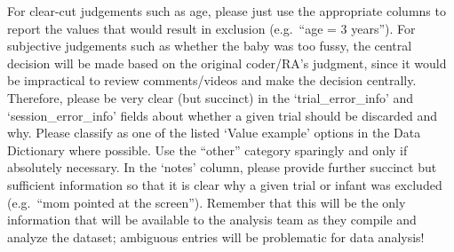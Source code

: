 \documentclass[
]{book}
\begin{document}
For clear-cut judgements such as age, please just use the appropriate columns to report the values that would result in exclusion (e.g.~``age = 3 years'').
For subjective judgements such as whether the baby was too fussy, the central decision will be made based on the original coder/RA's judgment, since it would be impractical to review comments/videos and make the decision centrally. Therefore, please be very clear (but succinct) in the `trial\_error\_info' and `session\_error\_info' fields about whether a given trial should be discarded and why. Please classify as one of the listed `Value example' options in the Data Dictionary where possible. Use the ``other'' category sparingly and only if absolutely necessary. In the `notes' column, please provide further succinct but sufficient information so that it is clear why a given trial or infant was excluded (e.g.~``mom pointed at the screen''). Remember that this will be the only information that will be available to the analysis team as they compile and analyze the dataset; ambiguous entries will be problematic for data analysis!
\end{document}
